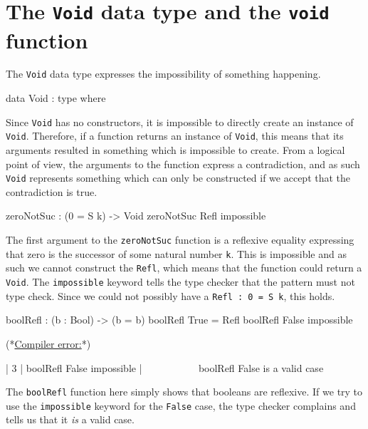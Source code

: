 \section{The \texttt{Void} data type and the \texttt{void} function}
    The \texttt{Void} data type expresses the impossibility of something happening.
        
    \begin{code}[caption={The \texttt{Void} type has no constructors}]
            data Void : type where
    \end{code}
    Since \texttt{Void} has no constructors, it is impossible to directly create an instance of \texttt{Void}. Therefore, if a function returns an instance of \texttt{Void}, this means that its arguments resulted in something which is impossible to create. From a logical point of view, the arguments to the function express a contradiction, and as such \texttt{Void} represents something which can only be constructed if we accept that the contradiction is true.
        
    \begin{code}[label={idr:zns}, caption={Zero cannot be the successor of a natural number}]
            zeroNotSuc : (0 = S k) -> Void
            zeroNotSuc Refl impossible
    \end{code}
    The first argument to the \texttt{zeroNotSuc} function is a reflexive equality expressing that zero is the successor of some natural number \texttt{k}. This is impossible and as such we cannot construct the \texttt{Refl}, which means that the function could return a \texttt{Void}. The \texttt{impossible} keyword tells the \Idris type checker that the pattern must not type check. Since we could not possibly have a \texttt{Refl : 0 = S k}, this holds.
    
    \begin{code}[caption={Invalid use of the \texttt{impossible} keyword}, escapeinside={(*}{*)}]
        boolRefl : (b : Bool) -> (b = b)
        boolRefl True = Refl
        boolRefl False impossible
        
        
        (*\underline{\textnormal {Compiler error:}}*)
        
          |
        3 | boolRefl False impossible
          |                ~~~~~~~~~~
        boolRefl False is a valid case
    \end{code}
    The \texttt{boolRefl} function here simply shows that booleans are reflexive. If we try to use the \texttt{impossible} keyword for the \texttt{False} case, the type checker complains and tells us that it \textit{is} a valid case.
        
